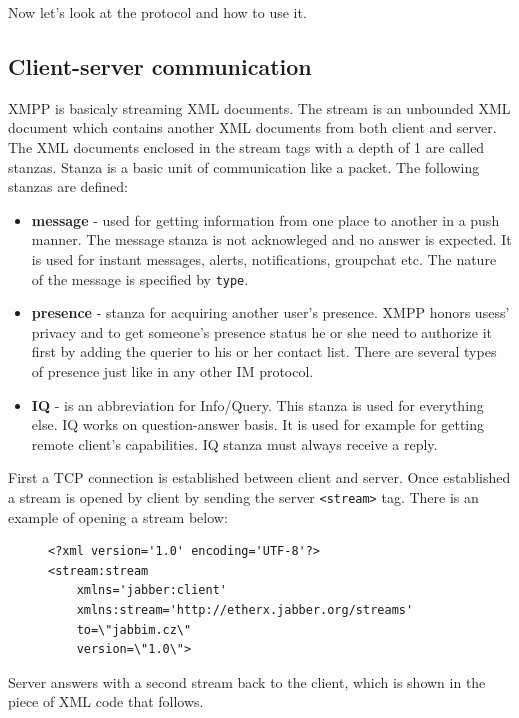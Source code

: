Now let's look at the protocol and how to use it. 

\subsection*{Client-server communication}
XMPP is basicaly streaming XML documents. The stream is an unbounded XML document which contains another XML documents from both client and server. The XML documents enclosed in the stream tags with a depth of 1 are called stanzas. Stanza is a basic unit of communication like a packet. The following stanzas are defined:

\begin{itemize}
	\item \textbf{message} - used for getting information from one place to another in a push manner. The message stanza is not acknowleged and no answer is expected. It is used for instant messages, alerts, notifications, groupchat etc. The nature of the message is specified by \verb|type|.  
	\item \textbf{presence} - stanza for acquiring another user's presence. XMPP honors usess' privacy and to get someone's presence status he or she need to authorize it first by adding the querier to his or her contact list. There are several types of presence just like in any other IM protocol.     
	\item	\textbf{IQ} - is an abbreviation for Info/Query. This stanza is used for everything else. IQ works on question-answer basis. It is used for example for getting remote client's capabilities. IQ stanza must always receive a reply. 
\end{itemize}

First a TCP connection is established between client and server. Once established a stream is opened by client by sending the server \verb|<stream>| tag. There is an example of opening a stream below: 

\begin{figure}[h]
\begin{lstlisting}
<?xml version='1.0' encoding='UTF-8'?>
<stream:stream 
	xmlns='jabber:client' 
	xmlns:stream='http://etherx.jabber.org/streams' 
	to=\"jabbim.cz\" 
	version=\"1.0\">
\end{lstlisting}
\end{figure}

Server answers with a second stream back to the client, which is shown in the piece of XML code that follows. 

